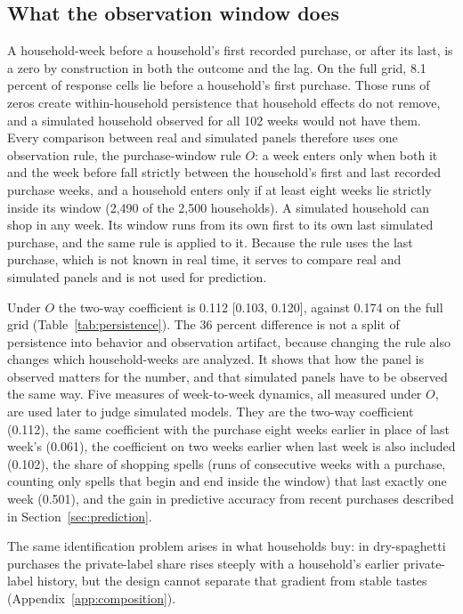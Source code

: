 \documentclass[11pt]{article}
\begin{document}
\subsection{What the observation window does}
\label{sec:window}

A household-week before a household's first recorded purchase, or after its last, is a zero
by construction in both the outcome and the lag. On the full grid, 8.1 percent of response
cells lie before a household's first purchase. Those runs of zeros create within-household
persistence that household effects do not remove, and a simulated household observed for all
102 weeks would not have them. Every comparison between real and simulated panels therefore
uses one observation rule, the purchase-window rule $O$: a week enters only when both it and
the week before fall strictly between the household's first and last recorded purchase
weeks, and a household enters only if at least eight weeks lie strictly inside its window
(2,490 of the 2,500 households). A simulated household can shop in any week. Its window runs from its own first to its own
last simulated purchase, and the same rule is applied to it. Because the rule uses the last
purchase, which is not known in real time, it serves to compare real and simulated panels
and is not used for prediction.

Under $O$ the two-way coefficient is 0.112 [0.103, 0.120], against 0.174 on the full grid
(Table~\ref{tab:persistence}). The 36 percent difference is not a split of persistence into
behavior and observation artifact, because changing the rule also changes which
household-weeks are analyzed. It shows that how the panel is observed matters for the number,
and that simulated panels have to be observed the same way. Five measures of week-to-week
dynamics, all measured under $O$, are used later to judge simulated models. They are the
two-way coefficient (0.112), the same coefficient with the purchase eight weeks earlier in
place of last week's (0.061), the coefficient on two weeks earlier when last week is also
included (0.102), the share of shopping spells (runs of consecutive weeks with a purchase,
counting only spells that begin and end inside the window) that last exactly one week (0.501),
and the gain in predictive accuracy from recent purchases
described in Section~\ref{sec:prediction}.

The same identification problem arises in what households buy: in dry-spaghetti purchases the
private-label share rises steeply with a household's earlier private-label history, but the
design cannot separate that gradient from stable tastes (Appendix~\ref{app:composition}).
\end{document}
